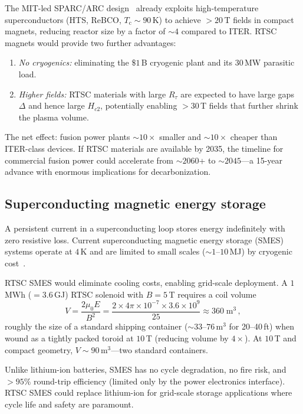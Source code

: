 \documentclass[prl,twocolumn,superscriptaddress,longbibliography,floatfix]{revtex4-2}
\newcommand{\tauasym}{\tau}
\newcommand{\Rtau}{R_{\tauasym}}
\newcommand{\Tc}{T_{\mathrm{c}}}
\begin{document}
The MIT-led SPARC/ARC design~\cite{Creely2020} already
exploits high-temperature superconductors (HTS, ReBCO,
$\Tc \sim 90\,$K) to achieve $> 20\,$T fields in compact
magnets, reducing reactor size by a factor of $\sim 4$
compared to ITER.  RTSC magnets would provide two further
advantages:
\begin{enumerate}
\item \emph{No cryogenics:} eliminating the $\$1\,$B cryogenic
  plant and its $30\,$MW parasitic load.
\item \emph{Higher fields:} RTSC materials with large
  $\Rtau$ are expected to have large gaps $\Delta$ and hence
  large $H_{c2}$, potentially enabling $> 30\,$T fields that
  further shrink the plasma volume.
\end{enumerate}
The net effect: fusion power plants $\sim 10\times$ smaller
and $\sim 10\times$ cheaper than ITER-class devices.  If RTSC
materials are available by 2035, the timeline for commercial
fusion power could accelerate from $\sim 2060$+ to
$\sim 2045$---a 15-year advance with enormous implications
for decarbonization.

\subsection{Superconducting magnetic energy storage}

A persistent current in a superconducting loop stores energy
indefinitely with zero resistive loss.  Current superconducting
magnetic energy storage (SMES) systems operate at $4\,$K and
are limited to small scales ($\sim 1$--$10\,$MJ) by cryogenic
cost~\cite{Ali2010}.

RTSC SMES would eliminate cooling costs, enabling grid-scale
deployment.  A $1\,$MWh ($= 3.6\,$GJ) RTSC solenoid with
$B = 5\,$T requires a coil volume
\begin{equation}\label{eq:smes}
  V = \frac{2\mu_0 E}{B^2}
  = \frac{2 \times 4\pi \times 10^{-7} \times 3.6 \times 10^9}
  {25}
  \approx 360\;\mathrm{m}^3\,,
\end{equation}
roughly the size of a standard shipping container
($\sim 33$--$76\,$m$^3$ for 20--40\,ft) when wound as a
tightly packed toroid at $10\,$T (reducing volume by
$4\times$).  At $10\,$T and compact geometry,
$V \sim 90\,$m$^3$---two standard containers.

Unlike lithium-ion batteries, SMES has no cycle degradation,
no fire risk, and $> 95\%$ round-trip efficiency (limited
only by the power electronics interface).  RTSC SMES could
replace lithium-ion for grid-scale storage applications where
cycle life and safety are paramount.
\end{document}
